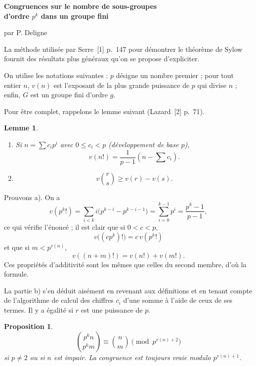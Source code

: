 \documentclass[11pt]{article}
\newtheorem{lemme}{Lemme}
\newtheorem{proposition}{Proposition}
\begin{document}
\begin{center}
{\Large\bfseries Congruences sur le nombre de sous-groupes\\
d'ordre \(p^k\) dans un groupe fini\par}
\vspace{1em}
par P. Deligne
\end{center}

\bigskip

La méthode utilisée par Serre~[1] p.~147 pour démontrer le théorème de Sylow
fournit des résultats plus généraux qu'on se propose d'expliciter.

On utilise les notations suivantes : \(p\) désigne un nombre premier ; pour tout
entier \(n\), \(v(n)\) est l'exposant de la plus grande puissance de \(p\) qui
divise \(n\) ; enfin, \(G\) est un groupe fini d'ordre \(g\).

Pour être complet, rappelons le lemme suivant (Lazard~[2] p.~71).

\begin{lemme}
\begin{enumerate}[label=\alph*)]
\item Si \(n=\sum c_i p^i\) avec \(0\leq c_i<p\) (développement de base \(p\)),
\[
        v(n!)=\frac{1}{p-1}\left(n-\sum c_i\right).
\]
\item \[
        v\binom{r}{s}\geq v(r)-v(s).
\]
\end{enumerate}
\end{lemme}

Prouvons a). On a
\[
v(p^k!)=\sum_{i<k} i\bigl(p^{k-i}-p^{k-i-1}\bigr)
       =\sum_{i=0}^{k-1}p^i=\frac{p^k-1}{p-1},
\]
ce qui vérifie l'énoncé ; il est clair que si \(0<c<p\),
\[
        v\bigl((cp^k)!\bigr)=c\,v(p^k!)
\]
et que si \(m<p^{v(n)}\),
\[
        v((n+m)!)=v(n!)+v(m!).
\]
Ces propriétés d'additivité sont les mêmes que celles du second membre, d'où
la formule.

La partie b) s'en déduit aisément en revenant aux définitions et en tenant
compte de l'algorithme de calcul des chiffres \(c_i\) d'une somme à l'aide de
ceux de ses termes. Il y a égalité si \(r\) est une puissance de \(p\).

\begin{proposition}
\[
        \binom{p^k n}{p^k m}\equiv \binom{n}{m}\pmod {p^{v(n)+2}}
\]
si \(p\neq2\) ou si \(n\) est impair. La congruence est toujours vraie modulo
\(p^{v(n)+1}\).
\end{proposition}
\end{document}
